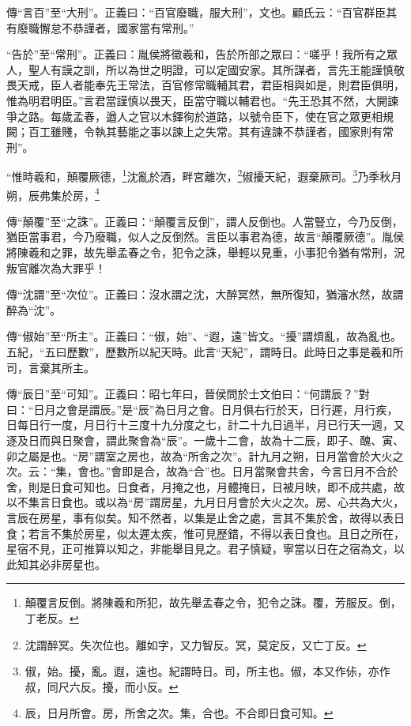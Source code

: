 {\noindent\zhuan{}\fzbyks 傳“言百”至“大刑”。正義曰：“百官廢職，服大刑”，文也。顧氏云：“百官群臣其有廢職懈怠不恭謹者，國家當有常刑。” \par}

{\noindent\shu{}\fzkt “告於”至“常刑”。正義曰：胤侯將徵羲和，告於所部之眾曰：“嗟乎！我所有之眾人，聖人有謨之訓，所以為世之明證，可以定國安家。其所謀者，言先王能謹慎敬畏天戒，臣人者能奉先王常法，百官修常職輔其君，君臣相與如是，則君臣俱明，惟為明君明臣。”言君當謹慎以畏天，臣當守職以輔君也。“先王恐其不然，大開諫爭之路。每歲孟春，遒人之官以木鐸徇於道路，以號令臣下，使在官之眾更相規闕；百工雖賤，令執其藝能之事以諫上之失常。其有違諫不恭謹者，國家則有常刑”。 \par}

“惟時羲和，顛覆厥德，\footnote{顛覆言反倒。將陳羲和所犯，故先舉孟春之令，犯令之誅。覆，芳服反。倒，丁老反。}沈亂於酒，畔宮離次，\footnote{沈謂醉冥。失次位也。離如字，又力智反。冥，莫定反，又亡丁反。}俶擾天紀，遐棄厥司。\footnote{俶，始。擾，亂。遐，遠也。紀謂時日。司，所主也。俶，本又作㑐，亦作叔，同尺六反。擾，而小反。}乃季秋月朔，辰弗集於房，\footnote{辰，日月所會。房，所舍之次。集，合也。不合即日食可知。}

{\noindent\zhuan{}\fzbyks 傳“顛覆”至“之誅”。正義曰：“顛覆言反倒”，謂人反倒也。人當豎立，今乃反倒，猶臣當事君，今乃廢職，似人之反倒然。言臣以事君為德，故言“顛覆厥德”。胤侯將陳羲和之罪，故先舉孟春之令，犯令之誅，舉輕以見重，小事犯令猶有常刑，況叛官離次為大罪乎！ \par}

{\noindent\zhuan{}\fzbyks 傳“沈謂”至“次位”。正義曰：沒水謂之沈，大醉冥然，無所復知，猶瀋水然，故謂醉為“沈”。 \par}

{\noindent\zhuan{}\fzbyks 傳“俶始”至“所主”。正義曰：“俶，始”、“遐，遠”皆文。“擾”謂煩亂，故為亂也。五紀，“五曰歷數”，歷數所以紀天時。此言“天紀”，謂時日。此時日之事是羲和所司，言棄其所主。 \par}

{\noindent\zhuan{}\fzbyks 傳“辰日”至“可知”。正義曰：昭七年曰，晉侯問於士文伯曰：“何謂辰？”對曰：“日月之會是謂辰。”是“辰”為日月之會。日月俱右行於天，日行遲，月行疾，日每日行一度，月日行十三度十九分度之七，計二十九日過半，月已行天一週，又逐及日而與日聚會，謂此聚會為“辰”。一歲十二會，故為十二辰，即子、醜、寅、卯之屬是也。“房”謂室之房也，故為“所舍之次”。計九月之朔，日月當會於大火之次。云：“集，會也。”會即是合，故為“合”也。日月當聚會共舍，今言日月不合於舍，則是日食可知也。日食者，月掩之也，月體掩日，日被月映，即不成共處，故以不集言日食也。或以為“房”謂房星，九月日月會於大火之次。房、心共為大火，言辰在房星，事有似矣。知不然者，以集是止舍之處，言其不集於舍，故得以表日食；若言不集於房星，似太遲太疾，惟可見歷錯，不得以表日食也。且日之所在，星宿不見，正可推算以知之，非能舉目見之。君子慎疑，寧當以日在之宿為文，以此知其必非房星也。 \par}

